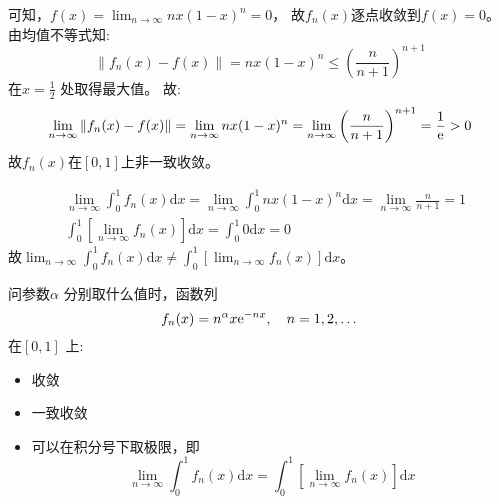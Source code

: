 \begin{solution}
    可知，\(f(x) = \lim_{n \to \infty} nx(1-x)^n = 0\)，
    故\(f_{n}(x)\)逐点收敛到\(f(x) = 0\)。
    由均值不等式知: \[
        \left\lVert f_{n}(x) - f(x) \right\rVert =
        nx(1-x)^{n} \le \left( \frac{n}{n + 1} \right)^{n+1}
    \]
    在\(x = \frac{1}{2}\) 处取得最大值。
    故: \[
        \lim_{n \to \infty} \left\lVert f_{n}(x) - f(x) \right\rVert
        = \lim_{n \to \infty} nx(1-x)^{n} = \lim_{n \to \infty}
        \left( \frac{n}{n + 1} \right)^{n+1} = \frac{1}{\mathrm{e}} > 0
    \]
    故\(f_{n}(x)\)在\([0,1]\)上非一致收敛。

    \begin{align*}
        & \lim_{n \to \infty} \int_0^1 f_n(x) \mathrm{d}x
        = \lim_{n \to \infty} \int_0^1 nx(1-x)^n \mathrm{d}x
        = \lim_{n \to \infty} \frac{n}{n+1} = 1
        \\
        & \int_0^1 \left[ \lim_{n \to \infty} f_n(x)
        \right] \mathrm{d}x
        = \int_0^1 0 \mathrm{d}x = 0
    \end{align*}
    故\(\lim_{n \to \infty} \int_0^1 f_n(x) \mathrm{d}x \neq \int_0^1
    \left[\lim_{n \to \infty} f_n(x) \right] \mathrm{d}x\)。
\end{solution}

\begin{problem}
    问参数\(\alpha\) 分别取什么值时，函数列
    \[
        f_n(x) = n^\alpha x\mathrm{e}^{-n x}, \quad n = 1, 2, \dots
    \] 在\([0,1]\) 上:
    \begin{itemize}
        \item 收敛
        \item 一致收敛
        \item 可以在积分号下取极限，即\[
                \lim_{n \to \infty} \int_0^1 f_n(x)
                \mathrm{d}x = \int_0^1
                \left[ \lim_{n \to \infty} f_n(x) \right] \mathrm{d}x
            \]
    \end{itemize}
\end{problem}

